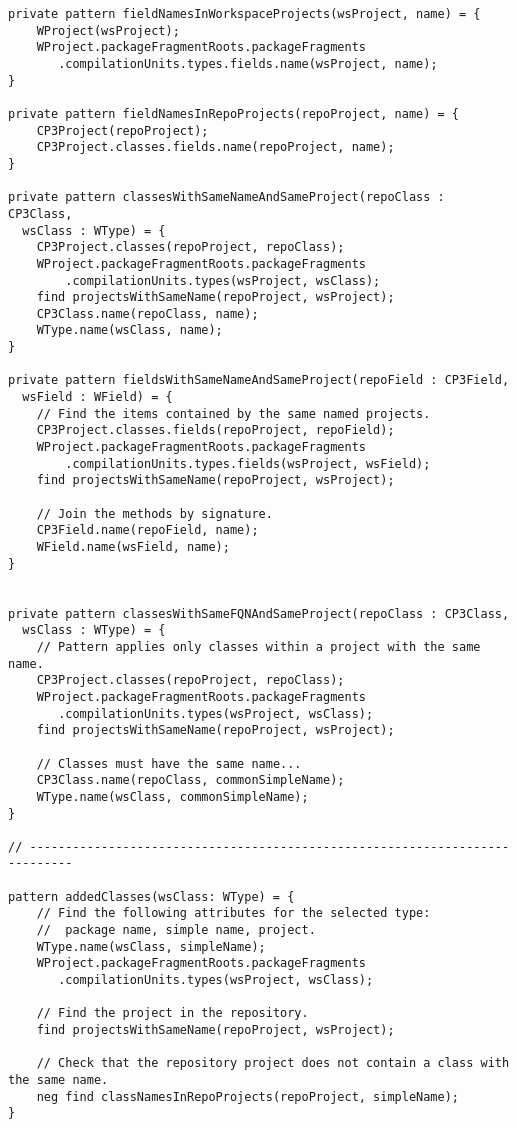 \begin{lstlisting}
private pattern fieldNamesInWorkspaceProjects(wsProject, name) = {
	WProject(wsProject);
	WProject.packageFragmentRoots.packageFragments
	   .compilationUnits.types.fields.name(wsProject, name);
}

private pattern fieldNamesInRepoProjects(repoProject, name) = {
	CP3Project(repoProject);
	CP3Project.classes.fields.name(repoProject, name);
}

private pattern classesWithSameNameAndSameProject(repoClass : CP3Class, 
  wsClass : WType) = {
	CP3Project.classes(repoProject, repoClass);
	WProject.packageFragmentRoots.packageFragments
	    .compilationUnits.types(wsProject, wsClass);
	find projectsWithSameName(repoProject, wsProject);
	CP3Class.name(repoClass, name);
	WType.name(wsClass, name);
}

private pattern fieldsWithSameNameAndSameProject(repoField : CP3Field, 
  wsField : WField) = {
	// Find the items contained by the same named projects.
	CP3Project.classes.fields(repoProject, repoField);
	WProject.packageFragmentRoots.packageFragments
	    .compilationUnits.types.fields(wsProject, wsField);
	find projectsWithSameName(repoProject, wsProject);

	// Join the methods by signature.
	CP3Field.name(repoField, name);
	WField.name(wsField, name);
}


private pattern classesWithSameFQNAndSameProject(repoClass : CP3Class, 
  wsClass : WType) = {
	// Pattern applies only classes within a project with the same name.
	CP3Project.classes(repoProject, repoClass);
	WProject.packageFragmentRoots.packageFragments
	   .compilationUnits.types(wsProject, wsClass);
	find projectsWithSameName(repoProject, wsProject);

	// Classes must have the same name...
	CP3Class.name(repoClass, commonSimpleName);
	WType.name(wsClass, commonSimpleName);
}

// ----------------------------------------------------------------------------

pattern addedClasses(wsClass: WType) = {
	// Find the following attributes for the selected type: 
	//  package name, simple name, project.
	WType.name(wsClass, simpleName);
	WProject.packageFragmentRoots.packageFragments
	   .compilationUnits.types(wsProject, wsClass);

	// Find the project in the repository.
	find projectsWithSameName(repoProject, wsProject);

	// Check that the repository project does not contain a class with the same name.
	neg find classNamesInRepoProjects(repoProject, simpleName);
}


\end{lstlisting}
